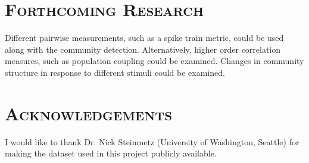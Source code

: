 \documentclass[a0,portrait]{a0poster}
\begin{document}
\begin{multicols}{2}

\section*{\color{NavyBlue}\textsc{Forthcoming Research}\color{Black}}

Different pairwise measurements, such as a spike train metric, could be used along with the community detection. Alternatively, higher order correlation measures, such as population coupling could be examined. Changes in community structure in response to different stimuli could be examined.


\section*{\color{NavyBlue}\textsc{Acknowledgements}\color{Black}}

I would like to thank Dr. Nick Steinmetz (University of Washington, Seattle) for making the dataset used in this project publicly available.




\end{multicols}
\end{document}
